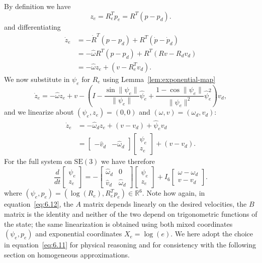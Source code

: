 \documentclass[11pt]{article}
\newcommand{\SE}{\mathrm{SE}}
\newcommand{\R}{\mathbb R}
\begin{document}
By definition we have
\begin{equation*}
z_e=R_e^Tp_e=R^T(p-p_d).\tag{6.11}\label{eq:6.11}
\end{equation*}
and differentiating
\begin{align*}
\dot z_e&=-\dot R^T(p-p_d)+R^T(\dot p-\dot p_d)\\
&=-\widehat\omega R^T(p-p_d)+R^T(Rv-R_dv_d)\\
&=-\widehat\omega z_e+(v-R_e^Tv_d).
\end{align*}
We now substitute in $\psi_e$ for $R_e$ using Lemma~\ref{lem:exponential-map}
\begin{equation*}
\dot z_e=-\widehat\omega z_e+v-\left(I-\frac{\sin\|\psi_e\|}{\|\psi_e\|}\widehat\psi_e+\frac{1-\cos\|\psi_e\|}{\|\psi_e\|^2}\widehat\psi_e^2\right)v_d,
\end{equation*}
and we linearize about $(\psi_e,z_e)=(0,0)$ and $(\omega,v)=(\omega_d,v_d)$:
\begin{align*}
\dot z_e&=-\widehat\omega_d z_e+(v-v_d)+\widehat\psi_ev_d\\
&=\begin{bmatrix}-\widehat v_d&-\widehat\omega_d\end{bmatrix}\begin{bmatrix}\psi_e\\z_e\end{bmatrix}+(v-v_d).
\end{align*}
For the full system on $\SE(3)$ we have therefore
\begin{equation*}
\frac{d}{dt}\begin{bmatrix}\psi_e\\z_e\end{bmatrix}
=-\begin{bmatrix}\widehat\omega_d&0\\\widehat v_d&\widehat\omega_d\end{bmatrix}
\begin{bmatrix}\psi_e\\z_e\end{bmatrix}
+I_6\begin{bmatrix}\omega-\omega_d\\v-v_d\end{bmatrix}.\tag{6.12}\label{eq:6.12}
\end{equation*}
where $(\psi_e,p_e)=(\log(R_e),R_e^Tp_e)\in\R^6$. Note how again, in equation~\eqref{eq:6.12}, the $A$ matrix depends linearly on the desired velocities, the $B$ matrix is the identity and neither of the two depend on trigonometric functions of the state; the same linearization is obtained using both mixed coordinates $(\psi_e,p_e)$ and exponential coordinates $X_e=\log(e)$. We here adopt the choice in equation~\eqref{eq:6.11} for physical reasoning and for consistency with the following section on homogeneous approximations.
\end{document}
